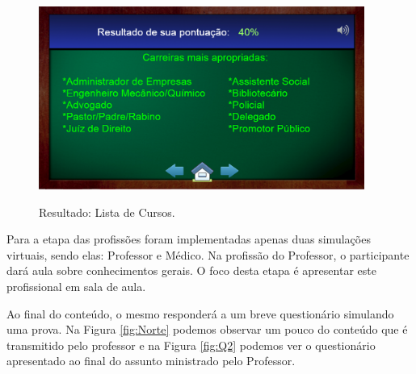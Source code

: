 \documentclass[
	12pt,				%
    oneside,			%
	a4paper,			%
	english,			%
	french,				%
	spanish,			%
	brazil,				%
	]{abntex2}
\begin{document}
\begin{figure} [H] 
\centering

\caption{Resultado: Lista de Cursos.}
\includegraphics[width=0.95\textwidth]{Pontuacao.PNG} %
\label{fig:resultado}
\end{figure}

Para a etapa das profissões foram implementadas apenas duas simulações virtuais, sendo elas: Professor e Médico. Na profissão do Professor, o participante dará aula sobre conhecimentos gerais. O foco desta etapa é apresentar este profissional em sala de aula. 

Ao final do conteúdo, o mesmo responderá a um breve questionário simulando uma prova. Na Figura \ref{fig:Norte}  podemos observar um pouco do conteúdo que é transmitido pelo professor e na Figura \ref{fig:Q2} podemos ver o questionário apresentado ao final do assunto ministrado pelo Professor.
\end{document}
